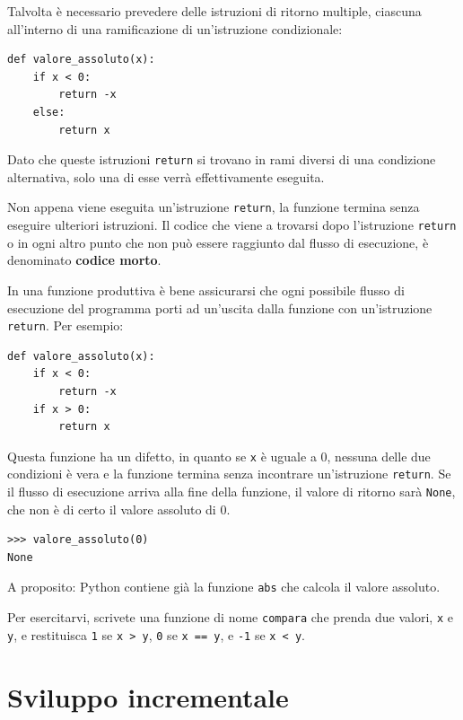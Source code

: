 \documentclass[10pt]{book}
\begin{document}
Talvolta è necessario prevedere delle istruzioni di ritorno multiple, ciascuna all'interno di una ramificazione di un'istruzione condizionale:

\begin{verbatim}
def valore_assoluto(x):
    if x < 0:
        return -x
    else:
        return x
\end{verbatim}
%
Dato che queste istruzioni {\tt return} si trovano in rami diversi di una
condizione alternativa, solo una di esse verrà effettivamente eseguita.

Non appena viene eseguita un'istruzione {\tt return}, la funzione termina senza eseguire ulteriori istruzioni. Il codice che viene a trovarsi dopo l'istruzione {\tt return} o in ogni altro punto che non può essere raggiunto dal flusso di esecuzione, è denominato {\bf codice morto}.

In una funzione produttiva è bene assicurarsi che ogni possibile flusso di esecuzione del programma porti ad un'uscita dalla funzione con un'istruzione
{\tt return}. Per esempio:

\begin{verbatim}
def valore_assoluto(x):
    if x < 0:
        return -x
    if x > 0:
        return x
\end{verbatim}
%
Questa funzione ha un difetto, in quanto se {\tt x} è uguale a 0, nessuna delle due condizioni è vera e la funzione termina senza incontrare un'istruzione {\tt return}. Se il flusso di esecuzione arriva alla fine della funzione, il valore di ritorno sarà {\tt None}, che non è di certo il valore assoluto di 0.

\begin{verbatim}
>>> valore_assoluto(0)
None
\end{verbatim}
%
A proposito: Python contiene già la funzione {\tt abs} che calcola il valore assoluto.

Per esercitarvi, scrivete una funzione di nome {\tt compara} che prenda due valori, {\tt x} e {\tt y}, e restituisca
 {\tt 1} se {\tt x > y}, {\tt 0} se {\tt x == y}, e {\tt -1} se {\tt x < y}.


\section{Sviluppo incrementale}
\label{incremental.development}
\end{document}
